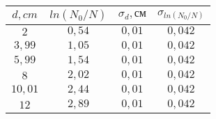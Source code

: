 \begin{tabular}{| c | c | c | c |}
\hline
$d, cm$ & $ln(N_0/N)$ & $\sigma_{d}, см$ & $\sigma_{ln(N_0/N)}$\\
\hline
$2$ & $0,54$ & $0,01$ & $0,042$\\
\hline
$3,99$ & $1,05$ & $0,01$ & $0,042$\\
\hline
$5,99$ & $1,54$ & $0,01$ & $0,042$\\
\hline
$8$ & $2,02$ & $0,01$ & $0,042$\\
\hline
$10,01$ & $2,44$ & $0,01$ & $0,042$\\
\hline
$12$ & $2,89$ & $0,01$ & $0,042$\\
\hline
\end{tabular}
